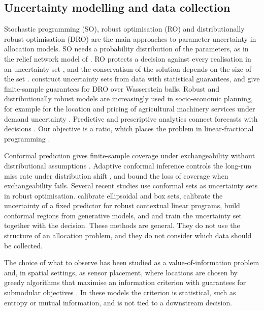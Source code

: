 \documentclass[preprint,12pt,number]{elsarticle}%
\theoremstyle{definition}
\theoremstyle{remark}
\begin{document}
\subsection{Uncertainty modelling and data collection}

Stochastic programming (SO), robust optimisation (RO) and distributionally robust optimisation (DRO) are the main approaches to parameter uncertainty in allocation models. SO needs a probability distribution of the parameters, as in the relief network model of \citet{noyan2016stochastic}. RO protects a decision against every realisation in an uncertainty set \citep{bental2009robust}, and the conservatism of the solution depends on the size of the set \citep{bertsimas2004price}. \citet{bertsimas2018datadriven} construct uncertainty sets from data with statistical guarantees, and \citet{esfahani2018datadriven} give finite-sample guarantees for DRO over Wasserstein balls. Robust and distributionally robust models are increasingly used in socio-economic planning, for example for the location and pricing of agricultural machinery services under demand uncertainty \citep{zhang2026robust}. Predictive and prescriptive analytics connect forecasts with decisions \citep{bertsimas2020predictive,elmachtoub2022spo}. Our objective is a ratio, which places the problem in linear-fractional programming \citep{charnes1962programming,dinkelbach1967nonlinear,schaible1983fractional}.

Conformal prediction gives finite-sample coverage under exchangeability without distributional assumptions \citep{vovk2005algorithmic,romano2019cqr}. Adaptive conformal inference controls the long-run miss rate under distribution shift \citep{gibbs2021aci}, and \citet{barber2023beyond} bound the loss of coverage when exchangeability fails. Several recent studies use conformal sets as uncertainty sets in robust optimisation. \citet{johnstone2021conformal} calibrate ellipsoidal and box sets, \citet{sun2023predict} calibrate the uncertainty of a fixed predictor for robust contextual linear programs, \citet{patel2024conformal} build conformal regions from generative models, and \citet{chenreddy2024endtoend} and \citet{yeh2025endtoend} train the uncertainty set together with the decision. These methods are general. They do not use the structure of an allocation problem, and they do not consider which data should be collected.

The choice of what to observe has been studied as a value-of-information problem \citep{howard1966information} and, in spatial settings, as sensor placement, where locations are chosen by greedy algorithms that maximise an information criterion with guarantees for submodular objectives \citep{nemhauser1978analysis,minoux1978accelerated,krause2008near}. In these models the criterion is statistical, such as entropy or mutual information, and is not tied to a downstream decision.
\end{document}
